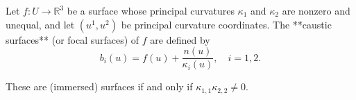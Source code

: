 Let $f: U \to \mathbb{R}^3$ be a surface whose principal curvatures $\kappa_1$ and $\kappa_2$ are nonzero and unequal, and let $(u^1, u^2)$ be principal curvature coordinates. The **caustic surfaces** (or focal surfaces) of $f$ are defined by
$$b_i(u) = f(u) + \frac{n(u)}{\kappa_i(u)}, \quad i = 1, 2.$$

These are (immersed) surfaces if and only if $\kappa_{1,1}\kappa_{2,2} \neq 0$.
